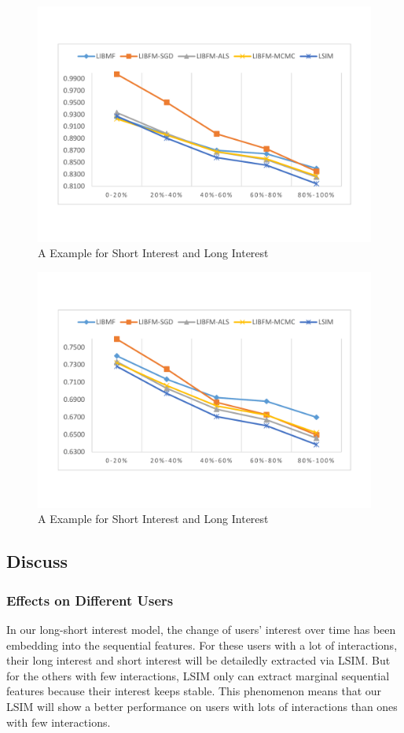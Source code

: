 \documentclass{sig-alternate-05-2015}
\begin{document}
\begin{figure}[htbp]
	\centering
	\includegraphics[scale=0.3]{images/rank_rsme.pdf}
	\caption{A Example for Short Interest and Long Interest}
	\label{fig:rank_rsme}
\end{figure}

\begin{figure}[htbp]
	\centering
	\includegraphics[scale=0.3]{images/rank_mae.pdf}
	\caption{A Example for Short Interest and Long Interest}
	\label{fig:rank_mae}
\end{figure}

\subsection{Discuss}

\subsubsection{Effects on Different Users}
In our long-short interest model, the change of users' interest over time has been
embedding into the sequential features. For these users with a lot of interactions,
their long interest and short interest will be detailedly extracted via LSIM.
But for the others with few interactions, LSIM only can extract marginal
sequential features because their interest keeps stable.
This phenomenon means that our LSIM will show a better performance on users with
lots of interactions than ones with few interactions.
\end{document}
